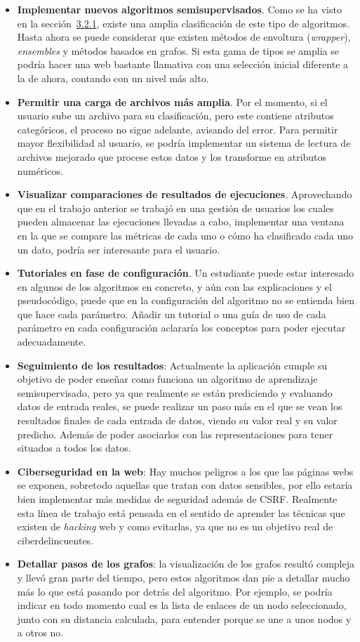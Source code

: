 \begin{itemize}
	\item \textbf{Implementar nuevos algoritmos semisupervisados}. Como se ha visto en la sección~\hyperref[sec3:tax]{3.2.1}, existe una amplia clasificación de este tipo de algoritmos. Hasta ahora se puede considerar que existen métodos de envoltura (\textit{wrapper}), \textit{ensembles} y métodos basados en grafos. Si esta gama de tipos se amplia se podría hacer una web bastante llamativa con una selección inicial diferente a la de ahora, contando con un nivel más alto.
	\item \textbf{Permitir una carga de archivos más amplia}. Por el momento, si el usuario sube un archivo para su clasificación, pero este contiene atributos categóricos, el proceso no sigue adelante, avisando del error. Para permitir mayor flexibilidad al usuario, se podría implementar un sistema de lectura de archivos mejorado que procese estos datos y los transforme en atributos numéricos.
	\item \textbf{Visualizar comparaciones de resultados de ejecuciones}. Aprovechando que en el trabajo anterior se trabajó en una gestión de usuarios los cuales pueden almacenar las ejecuciones llevadas a cabo, implementar una ventana en la que se compare las métricas de cada uno o cómo ha clasificado cada uno un dato, podría ser interesante para el usuario.
	\item \textbf{Tutoriales en fase de configuración}. Un estudiante puede estar interesado en algunos de los algoritmos en concreto, y aún con las explicaciones y el pseudocódigo, puede que en la configuración del algoritmo no se entienda bien que hace cada parámetro. Añadir un tutorial o una guía de uso de cada parámetro en cada configuración aclararía los conceptos para poder ejecutar adecuadamente.
	\item \textbf{Seguimiento de los resultados}: Actualmente la aplicación cumple su objetivo de poder enseñar como funciona un algoritmo de aprendizaje semisupervisado, pero ya que realmente se están prediciendo y evaluando datos de entrada reales, se puede realizar un paso más en el que se vean los resultados finales de cada entrada de datos, viendo su valor real y su valor predicho. Además de poder asociarlos con las representaciones para tener situados a todos los datos.
	\item \textbf{Ciberseguridad en la web}: Hay muchos peligros a los que las páginas webs se exponen, sobretodo aquellas que tratan con datos sensibles, por ello estaría bien implementar más medidas de seguridad además de CSRF. Realmente esta línea de trabajo está pensada en el sentido de aprender las técnicas que existen de \textit{hacking} web y como evitarlas, ya que no es un objetivo real de ciberdelincuentes.
	\item \textbf{Detallar pasos de los grafos}: la visualización de los grafos resultó compleja y llevó gran parte del tiempo, pero estos algoritmos dan pie a detallar mucho más lo que está pasando por detrás del algoritmo. Por ejemplo, se podría indicar en todo momento cual es la lista de enlaces de un nodo seleccionado, junto con su distancia calculada, para entender porque se une a unos nodos y a otros no.
\end{itemize}